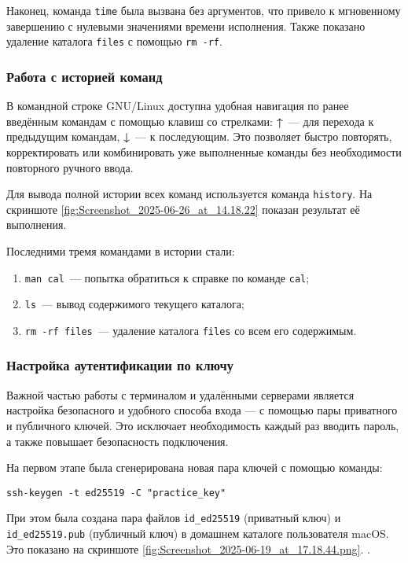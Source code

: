 Наконец, команда \texttt{time} была вызвана без аргументов, что привело к мгновенному завершению с нулевыми значениями времени исполнения. Также показано удаление каталога \texttt{files} с помощью \texttt{rm -rf}.

\subsubsection{Работа с историей команд}

В командной строке GNU/Linux доступна удобная навигация по ранее введённым командам с помощью клавиш со стрелками: \textbf{↑}~— для перехода к предыдущим командам, \textbf{↓}~— к последующим. Это позволяет быстро повторять, корректировать или комбинировать уже выполненные команды без необходимости повторного ручного ввода.

Для вывода полной истории всех команд используется команда \texttt{history}. На скриншоте \ref{fig:Screenshot_2025-06-26_at_14.18.22} показан результат её выполнения.

Последними тремя командами в истории стали:
\begin{enumerate}
    \item \texttt{man cal}~— попытка обратиться к справке по команде \texttt{cal};
    \item \texttt{ls}~— вывод содержимого текущего каталога;
    \item \texttt{rm -rf files}~— удаление каталога \texttt{files} со всем его содержимым.
\end{enumerate}


\subsubsection*{Настройка аутентификации по ключу}

Важной частью работы с терминалом и удалёнными серверами является настройка безопасного и удобного способа входа — с помощью пары приватного и публичного ключей. Это исключает необходимость каждый раз вводить пароль, а также повышает безопасность подключения.

На первом этапе была сгенерирована новая пара ключей с помощью команды:
\begin{verbatim}
ssh-keygen -t ed25519 -C "practice_key"
\end{verbatim}
При этом была создана пара файлов \verb|id_ed25519| (приватный ключ) и \verb|id_ed25519.pub| (публичный ключ) в домашнем каталоге пользователя macOS. Это показано на скриншоте \ref{fig:Screenshot_2025-06-19_at_17.18.44.png}.
.

